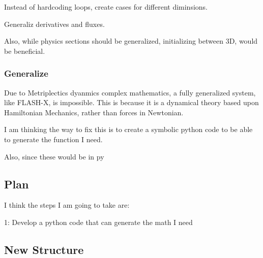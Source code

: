 Instead of hardcoding loops, create cases for different diminsions.


Generaliz derivatives and fluxes.

Also, while physics sections should be generalized, initializing between 3D, would be beneficial.
\subsubsection{Generalize}
Due to Metriplectics dyanmics complex mathematics, a fully generalized system, like FLASH-X, is impossible. This is because it is a dynamical theory based upon Hamiltonian Mechanics, rather than forces in Newtonian.

I am thinking the way to fix this is to create a symbolic python code to be able to generate the function I need.

Also, since these would be in py
\subsection{Plan}

I think the steps I am going to take are:

1: Develop a python code that can generate the math I need
\subsection{New Structure}


